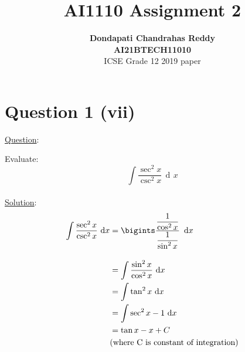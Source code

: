\documentclass[journal,12pt,twocolumn]{IEEEtran}
\DeclareMathOperator{\di}{d\!}
\begin{document}
\title{\textbf{AI1110 Assignment 2} }
\author{\textbf{Dondapati Chandrahas Reddy}\\\textbf{AI21BTECH11010}\\ ICSE Grade 12 2019 paper}
\maketitle

{\section{Question 1 (vii)\newline}}

{\large \underline{Question}:\newline}

Evaluate:
\begin{equation}
	\int \dfrac{\sec^2 x}{\csc^2 x} \,\di x 
\end{equation}\\

{\large \underline{Solution}:}\\

\begin{align}
	\int \dfrac{\sec^2 x}{\csc^2 x} \,\di x &= \bigints \dfrac{\dfrac{1}{\cos^2 x}}{\dfrac{1}{\sin^2 x}} \,\,\di x \\[1em]
	&= \int \dfrac{\sin^2 x}{\cos^2 x} \, \di x \\
	&= \int \tan^2 x \,\di x \\
	&= \int \sec^2 x-1 \,\di x \\
	&= \tan x - x + C \\
	& \text{(where C is constant of integration)} \nonumber
\end{align}
\end{document}
